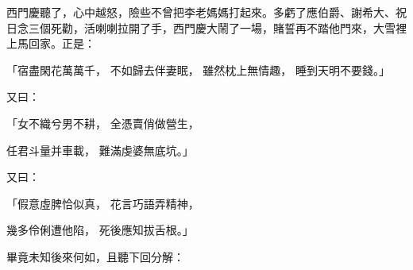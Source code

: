 \begin{showcontents}{}
西門慶聽了，心中越怒，險些不曾把李老媽媽打起來。多虧了應伯爵、謝希大、祝日念三個死勸，活喇喇拉開了手，西門慶大鬧了一場，賭誓再不踏他門來，大雪裡上馬回家。正是：

「宿盡閑花萬萬千，  不如歸去伴妻眠，     雖然枕上無情趣，  睡到天明不要錢。」

又曰：

「女不織兮男不耕，  全憑賣俏做營生，

任君斗量并車載，  難滿虔婆無底坑。」

又曰：

「假意虛脾恰似真，  花言巧語弄精神，

幾多伶俐遭他陷，  死後應知拔舌根。」

畢竟未知後來何如，且聽下回分解：




\end{showcontents}
